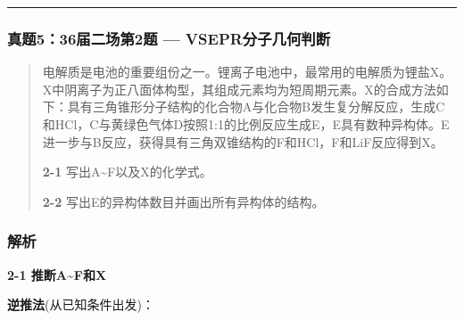 \documentclass[a4paper,11pt]{ctexart}
\newcommand{\箭}{\ensuremath{\rightarrow}}
\newcommand{\左箭}{\ensuremath{\leftarrow}}
\newcommand{\上箭}{\ensuremath{\uparrow}}
\newcommand{\下箭}{\ensuremath{\downarrow}}
\newcommand{\衡}{\ensuremath{\rightleftharpoons}}
\newcommand{\双箭}{\ensuremath{\leftrightarrow}}
\newcommand{\约等于}{\ensuremath{\approx}}
\newcommand{\小于等于}{\ensuremath{\leq}}
\newcommand{\大于等于}{\ensuremath{\geq}}
\newcommand{\不等于}{\ensuremath{\neq}}
\newcommand{\西格马}{\ensuremath{\sigma}}
\newcommand{\派}{\ensuremath{\pi}}
\begin{document}
\begin{center}\rule{0.5\linewidth}{0.5pt}\end{center}

\subsubsection{真题5：36届二场第2题 --- VSEPR分子几何判断}\label{ux771fux9898536ux5c4aux4e8cux573aux7b2c2ux9898-vseprux5206ux5b50ux51e0ux4f55ux5224ux65ad}

\begin{quote}
电解质是电池的重要组份之一。锂离子电池中，最常用的电解质为锂盐X。X中阴离子为正八面体构型，其组成元素均为短周期元素。X的合成方法如下：具有三角锥形分子结构的化合物A与化合物B发生复分解反应，生成C和HCl，C与黄绿色气体D按照1:1的比例反应生成E，E具有数种异构体。E进一步与B反应，获得具有三角双锥结构的F和HCl，F和LiF反应得到X。

\textbf{2-1} 写出A\textasciitilde F以及X的化学式。

\textbf{2-2} 写出E的异构体数目并画出所有异构体的结构。
\end{quote}

\subsubsection{解析}\label{ux89e3ux6790-4}

\textbf{2-1 推断A\textasciitilde F和X}

\textbf{逆推法}(从已知条件出发)：
\end{document}
